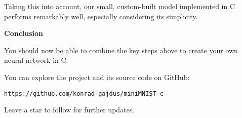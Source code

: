Taking this into account, our small, custom-built model implemented in C
performs remarkably well, especially considering its simplicity.

\vspace{5mm}
{\noindent\huge\bf Conclusion}
\vspace{5mm}

You should now be able to combine the key steps above to create your own neural
network in C.

You can explore the project and its source code on GitHub:
\begin{verbatim}
https://github.com/konrad-gajdus/miniMNIST-c
\end{verbatim}


Leave a star to follow for further updates.

